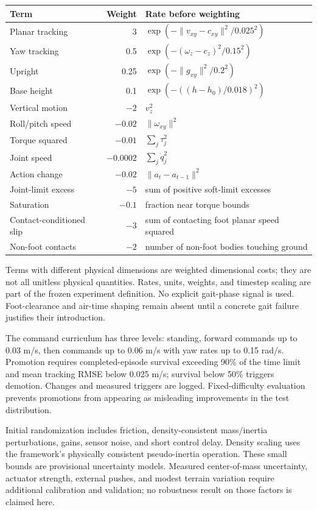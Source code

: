 \documentclass[11pt]{article}
\begin{document}
\begin{longtable}{lrl}
\toprule Term & Weight & Rate before weighting\\\midrule
Planar tracking &3&$\exp(-\|v_{xy}-c_{xy}\|^2/0.025^2)$\\
Yaw tracking &0.5&$\exp(-(\omega_z-c_z)^2/0.15^2)$\\
Upright &0.25&$\exp(-\|g_{xy}\|^2/0.2^2)$\\
Base height &0.1&$\exp(-((h-h_0)/0.018)^2)$\\
Vertical motion &$-2$&$v_z^2$\\
Roll/pitch speed &$-0.02$&$\|\omega_{xy}\|^2$\\
Torque squared &$-0.01$&$\sum_j\tau_j^2$\\
Joint speed &$-0.0002$&$\sum_j\dot q_j^2$\\
Action change &$-0.02$&$\|a_t-a_{t-1}\|^2$\\
Joint-limit excess &$-5$&sum of positive soft-limit excesses\\
Saturation &$-0.1$&fraction near torque bounds\\
Contact-conditioned slip &$-3$&sum of contacting foot planar speed squared\\
Non-foot contacts &$-2$&number of non-foot bodies touching ground\\\bottomrule
\end{longtable}
Terms with different physical dimensions are weighted dimensional costs; they are not all unitless physical quantities. Rates, units, weights, and timestep scaling are part of the frozen experiment definition. No explicit gait-phase signal is used. Foot-clearance and air-time shaping remain absent until a concrete gait failure justifies their introduction.

The command curriculum has three levels: standing, forward commands up to 0.03 m/s, then commands up to 0.06 m/s with yaw rates up to 0.15 rad/s. Promotion requires completed-episode survival exceeding 90\% of the time limit and mean tracking RMSE below 0.025 m/s; survival below 50\% triggers demotion. Changes and measured triggers are logged. Fixed-difficulty evaluation prevents promotions from appearing as misleading improvements in the test distribution.

Initial randomization includes friction, density-consistent mass/inertia perturbations, gains, sensor noise, and short control delay. Density scaling uses the framework's physically consistent pseudo-inertia operation. These small bounds are provisional uncertainty models. Measured center-of-mass uncertainty, actuator strength, external pushes, and modest terrain variation require additional calibration and validation; no robustness result on those factors is claimed here.
\end{document}

